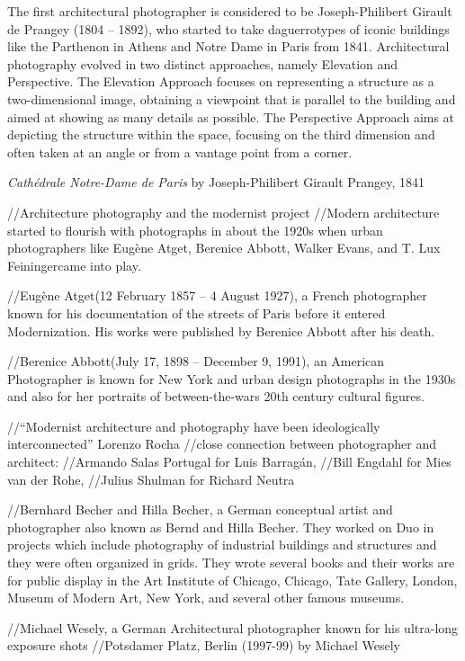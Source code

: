 \documentclass[
  openany]{book}
\begin{document}
The first architectural photographer is considered to be Joseph-Philibert Girault de Prangey (1804 -- 1892), who started to take daguerrotypes of iconic buildings like the Parthenon in Athens and Notre Dame in Paris from 1841. Architectural photography evolved in two distinct approaches, namely Elevation and Perspective. The Elevation Approach focuses on representing a structure as a two-dimensional image, obtaining a viewpoint that is parallel to the building and aimed at showing as many details as possible. The Perspective Approach aims at depicting the structure within the space, focusing on the third dimension and often taken at an angle or from a vantage point from a corner.

\emph{Cathédrale Notre-Dame de Paris} by Joseph-Philibert Girault Prangey, 1841

//Architecture photography and the modernist project
//Modern architecture started to flourish with photographs in about the 1920s when urban photographers like Eugène Atget, Berenice Abbott, Walker Evans, and T. Lux Feiningercame into play.

//Eugène Atget(12 February 1857 -- 4 August 1927), a French photographer known for his documentation of the streets of Paris before it entered Modernization. His works were published by Berenice Abbott after his death.

//Berenice Abbott(July 17, 1898 -- December 9, 1991), an American Photographer is known for New York and urban design photographs in the 1930s and also for her portraits of between-the-wars 20th century cultural figures.

//``Modernist architecture and photography have been ideologically interconnected'' Lorenzo Rocha
//close connection between photographer and architect:
//Armando Salas Portugal for Luis Barragán,
//Bill Engdahl for Mies van der Rohe,
//Julius Shulman for Richard Neutra

//Bernhard Becher and Hilla Becher, a German conceptual artist and photographer also known as Bernd and Hilla Becher. They worked on Duo in projects which include photography of industrial buildings and structures and they were often organized in grids. They wrote several books and their works are for public display in the Art Institute of Chicago, Chicago, Tate Gallery, London, Museum of Modern Art, New York, and several other famous museums.

//Michael Wesely, a German Architectural photographer known for his ultra-long exposure shots //Potsdamer Platz, Berlin (1997-99) by Michael Wesely
\end{document}
